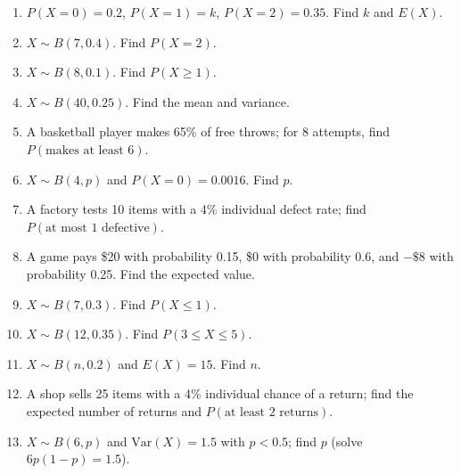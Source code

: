 \documentclass[11pt]{article}
\begin{document}
\begin{recapbox}
\begin{multicols}{2}
\small
\begin{enumerate}[leftmargin=*,itemsep=3pt]
  \item $P(X=0)=0.2$, $P(X=1)=k$, $P(X=2)=0.35$. Find $k$ and $E(X)$.
  \item $X\sim B(7,0.4)$. Find $P(X=2)$.
  \item $X\sim B(8,0.1)$. Find $P(X\geq1)$.
  \item $X\sim B(40,0.25)$. Find the mean and variance.
  \item A basketball player makes 65\% of free throws; for 8 attempts, find $P(\text{makes at least 6})$.
  \item $X\sim B(4,p)$ and $P(X=0)=0.0016$. Find $p$.
  \item A factory tests 10 items with a 4\% individual defect rate; find $P(\text{at most 1 defective})$.
  \item A game pays \$20 with probability 0.15, \$0 with probability 0.6, and $-\$8$ with probability 0.25. Find the expected value.
  \item $X\sim B(7,0.3)$. Find $P(X\leq1)$.
  \item $X\sim B(12,0.35)$. Find $P(3\leq X\leq5)$.
  \item $X\sim B(n,0.2)$ and $E(X)=15$. Find $n$.
  \item A shop sells 25 items with a 4\% individual chance of a return; find the expected number of returns and $P(\text{at least 2 returns})$.
  \item $X\sim B(6,p)$ and $\text{Var}(X)=1.5$ with $p<0.5$; find $p$ (solve $6p(1-p)=1.5$).
\end{enumerate}
\end{multicols}
\end{recapbox}
\end{document}
